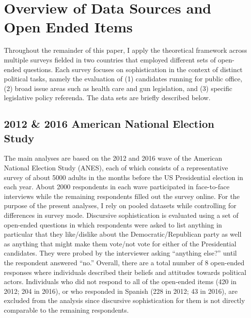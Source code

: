 \section{Overview of Data Sources and Open Ended Items}\label{app:items}

Throughout the remainder of this paper, I apply the theoretical framework across multiple surveys fielded in two countries that employed different sets of open-ended questions. Each survey focuses on sophistication in the context of distinct political tasks, namely the evaluation of (1) candidates running for public office, (2) broad issue areas such as health care and gun legislation, and (3) specific legislative policy referenda. The data sets are briefly described below.


\subsection{2012 \& 2016 American National Election Study}
The main analyses are based on the 2012 and 2016 wave of the American National Election Study (ANES), each of which consists of a representative survey of about 5000 adults in the months before the US Presidential election in each year. About 2000 respondents in each wave participated in face-to-face interviews while the remaining respondents filled out the survey online. For the purpose of the present analyses, I rely on pooled datasets while controlling for differences in survey mode. Discursive sophistication is evaluated using a set of open-ended questions in which respondents were asked to list anything in particular that they like/dislike about the Democratic/Republican party as well as anything that might make them vote/not vote for either of the Presidential candidates. They were probed by the interviewer asking ``anything else?'' until the respondent answered ``no.'' Overall, there are a total number of 8 open-ended responses where individuals described their beliefs and attitudes towards political actors. Individuals who did not respond to all of the open-ended items (420 in 2012; 204 in 2016), or who responded in Spanish (228 in 2012; 43 in 2016), are excluded from the analysis since discursive sophistication for them is not directly comparable to the remaining respondents.

